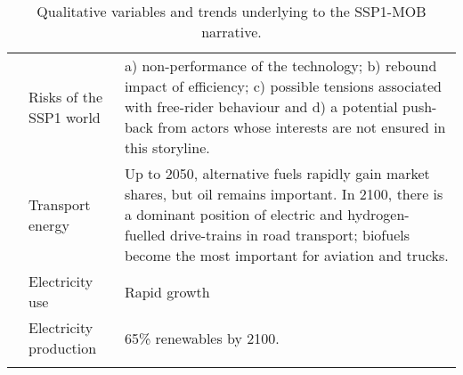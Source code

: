 {\begin{longtable}{p{3cm}p{3.5cm}p{8cm}}
\textit{} & Risks of the SSP1 world & a) non-performance of the technology; b) rebound impact of efficiency; c) possible tensions associated with free-rider behaviour and d) a potential push-back from actors whose interests are not ensured in this storyline.\\
\textit{} & Transport energy & Up to 2050, alternative fuels rapidly gain market shares, but oil remains important. In 2100, there is a dominant position of electric and hydrogen-fuelled drive-trains in road transport; biofuels become the most important for aviation and trucks.\\
\textit{} & Electricity use & Rapid growth\\
\textit{} & Electricity production & 65\% renewables by 2100.\\ \bottomrule
\caption{Qualitative variables and trends underlying to the \gls{SSP1-MOB} narrative.}
\label{t:ssp1-mob-narrative-vars}
\end{longtable}
}